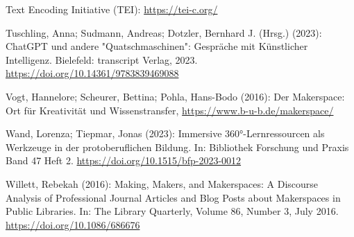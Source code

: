 \documentclass[a4paper,
fontsize=11pt,
oneside,
numbers=noperiodatend,
parskip=half-,
bibliography=totoc,
final
]{scrartcl}
\begin{document}
Text Encoding Initiative (TEI): \url{https://tei-c.org/}

Tuschling, Anna; Sudmann, Andreas; Dotzler, Bernhard J. (Hrsg.) (2023):
ChatGPT und andere "Quatschmaschinen": Gespräche mit Künstlicher
Intelligenz. Bielefeld: transcript Verlag, 2023.
\url{https://doi.org/10.14361/9783839469088}

Vogt, Hannelore; Scheurer, Bettina; Pohla, Hans-Bodo (2016): Der
Makerspace: Ort für Kreativität und Wissenstransfer,
\url{https://www.b-u-b.de/makerspace/}

Wand, Lorenza; Tiepmar, Jonas (2023): Immersive 360°-Lernressourcen als
Werkzeuge in der protoberuflichen Bildung. In: Bibliothek Forschung und
Praxis Band 47 Heft 2. \url{https://doi.org/10.1515/bfp-2023-0012}

Willett, Rebekah (2016): Making, Makers, and Makerspaces: A Discourse
Analysis of Professional Journal Articles and Blog Posts about
Makerspaces in Public Libraries. In: The Library Quarterly, Volume 86,
Number 3, July 2016. \url{https://doi.org/10.1086/686676}

\end{document}
